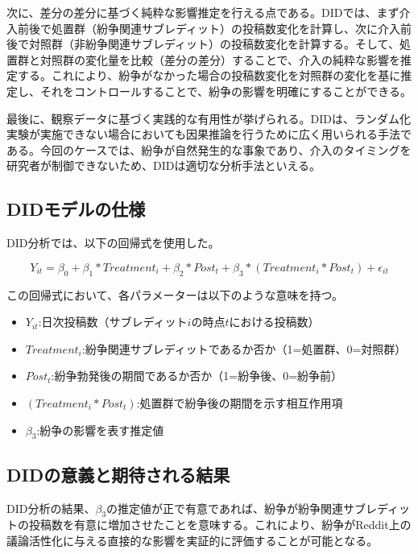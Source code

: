\documentclass[11pt, a4j]{jreport}
\begin{document}
    次に、差分の差分に基づく純粋な影響推定を行える点である。DIDでは、まず介入前後で処置群（紛争関連サブレディット）の投稿数変化を計算し、次に介入前後で対照群（非紛争関連サブレディット）の投稿数変化を計算する。そして、処置群と対照群の変化量を比較（差分の差分）することで、介入の純粋な影響を推定する。これにより、紛争がなかった場合の投稿数変化を対照群の変化を基に推定し、それをコントロールすることで、紛争の影響を明確にすることができる。
    
    最後に、観察データに基づく実践的な有用性が挙げられる。DIDは、ランダム化実験が実施できない場合においても因果推論を行うために広く用いられる手法である。今回のケースでは、紛争が自然発生的な事象であり、介入のタイミングを研究者が制御できないため、DIDは適切な分析手法といえる。

    \subsection{DIDモデルの仕様}
    DID分析では、以下の回帰式を使用した。

    \begin{equation}
        Y_{it} = \beta_{0} + \beta_{1}*Treatment_{i} + \beta_{2}*Post_{t} + \beta_{3}*(Treatment_{i} * Post_{t}) + \epsilon_{it}
    \end{equation}

    この回帰式において、各パラメーターは以下のような意味を持つ。
    \begin{itemize}
        \item $Y_{it}$:日次投稿数（サブレディット$i$の時点$t$における投稿数）
        \item $Treatment_{i}$:紛争関連サブレディットであるか否か（1=処置群、0=対照群）
        \item $Post_{t}$:紛争勃発後の期間であるか否か（1=紛争後、0=紛争前）
        \item $(Treatment_{i} * Post_{t})$:処置群で紛争後の期間を示す相互作用項
        \item $\beta_{3}$:紛争の影響を表す推定値
    \end{itemize}

    \subsection{DIDの意義と期待される結果}
    DID分析の結果、$\beta_{3}$の推定値が正で有意であれば、紛争が紛争関連サブレディットの投稿数を有意に増加させたことを意味する。これにより、紛争がReddit上の議論活性化に与える直接的な影響を実証的に評価することが可能となる。
\end{document}
